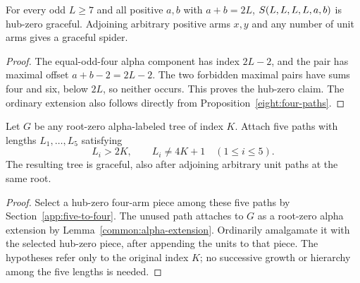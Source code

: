 \begin{corollary}\label{eight:equal-four-six-core}
For every odd $L\ge7$ and all positive $a,b$ with $a+b=2L$,
$S\!\left(L,L,L,L,a,b\right)$ is hub-zero graceful.  Adjoining arbitrary positive
arms $x,y$ and any number of unit arms gives a graceful spider.
\end{corollary}
\begin{proof}
The equal-odd-four alpha component has index $2L-2$, and the pair has
maximal offset $a+b-2=2L-2$.  The two forbidden maximal pairs have
sums four and six, below $2L$, so neither occurs.  This proves the
hub-zero claim.  The ordinary extension also follows directly from
Proposition~\ref{eight:four-paths}.
\end{proof}

\begin{proposition}\label{eight:five-long-paths}
Let $G$ be any root-zero alpha-labeled tree of index $K$.  Attach five
paths with lengths $L_1,\ldots,L_5$ satisfying
\[
 L_i>2K,\qquad L_i\ne4K+1\quad(1\le i\le5).
\]
The resulting tree is graceful, also after adjoining arbitrary unit
paths at the same root.
\end{proposition}
\begin{proof}
Select a hub-zero four-arm piece among these five paths by
Section~\ref{app:five-to-four}.  The unused path attaches to $G$ as a
root-zero alpha extension by Lemma~\ref{common:alpha-extension}.
Ordinarily amalgamate it with the selected hub-zero piece, after
appending the units to that piece.  The hypotheses refer only to the
original index $K$; no successive growth or hierarchy among the five
lengths is needed.
\end{proof}


